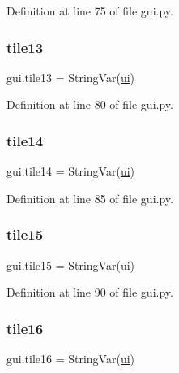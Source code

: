 Definition at line 75 of file gui.\+py.

\mbox{\label{namespacegui_ab62f6b286631ccfcc67e468618513305}} 
\subsubsection{\texorpdfstring{tile13}{tile13}}
{\footnotesize\ttfamily gui.\+tile13 = String\+Var(\mbox{\hyperlink{namespacegui_a40ab7281456eadbea2dc2038f5c24fa1}{ui}})}



Definition at line 80 of file gui.\+py.

\mbox{\label{namespacegui_a5cf77212c983a05affbe474cb1364620}} 
\subsubsection{\texorpdfstring{tile14}{tile14}}
{\footnotesize\ttfamily gui.\+tile14 = String\+Var(\mbox{\hyperlink{namespacegui_a40ab7281456eadbea2dc2038f5c24fa1}{ui}})}



Definition at line 85 of file gui.\+py.

\mbox{\label{namespacegui_a4e71059635ebf9d3f27d42d153a8cd3b}} 
\subsubsection{\texorpdfstring{tile15}{tile15}}
{\footnotesize\ttfamily gui.\+tile15 = String\+Var(\mbox{\hyperlink{namespacegui_a40ab7281456eadbea2dc2038f5c24fa1}{ui}})}



Definition at line 90 of file gui.\+py.

\mbox{\label{namespacegui_acbacb920e84bd9606a9c5d5f9e948d8c}} 
\subsubsection{\texorpdfstring{tile16}{tile16}}
{\footnotesize\ttfamily gui.\+tile16 = String\+Var(\mbox{\hyperlink{namespacegui_a40ab7281456eadbea2dc2038f5c24fa1}{ui}})}



